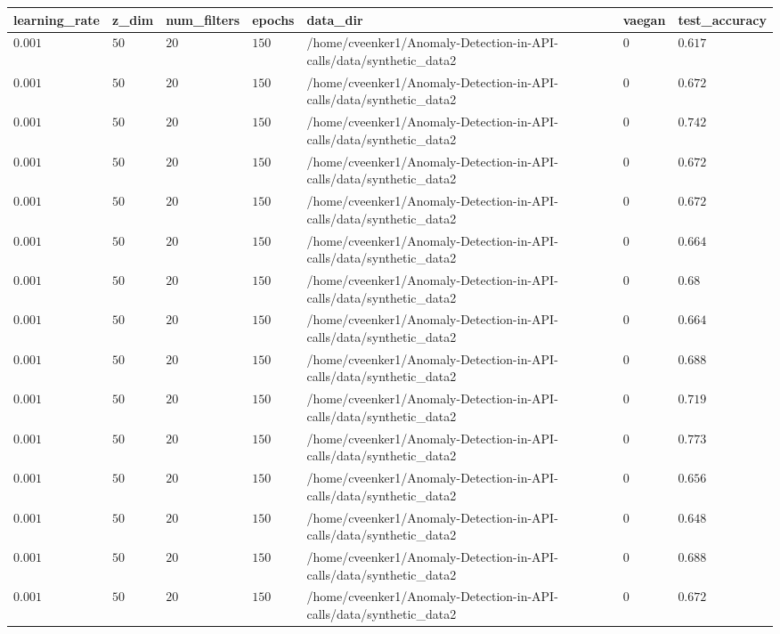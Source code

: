 \begin{table}[tbp]
\begin{tabular}{lllllll}
learning\_rate & z\_dim & num\_filters & epochs & data\_dir & vaegan & test\_accuracy \\ \hline
$0.001$ & $50$ & $20$ & $150$ & /home/cveenker1/Anomaly-Detection-in-API-calls/data/synthetic\_data2 & $0$ & $0.617$ \\
$0.001$ & $50$ & $20$ & $150$ & /home/cveenker1/Anomaly-Detection-in-API-calls/data/synthetic\_data2 & $0$ & $0.672$ \\
$0.001$ & $50$ & $20$ & $150$ & /home/cveenker1/Anomaly-Detection-in-API-calls/data/synthetic\_data2 & $0$ & $0.742$ \\
$0.001$ & $50$ & $20$ & $150$ & /home/cveenker1/Anomaly-Detection-in-API-calls/data/synthetic\_data2 & $0$ & $0.672$ \\
$0.001$ & $50$ & $20$ & $150$ & /home/cveenker1/Anomaly-Detection-in-API-calls/data/synthetic\_data2 & $0$ & $0.672$ \\
$0.001$ & $50$ & $20$ & $150$ & /home/cveenker1/Anomaly-Detection-in-API-calls/data/synthetic\_data2 & $0$ & $0.664$ \\
$0.001$ & $50$ & $20$ & $150$ & /home/cveenker1/Anomaly-Detection-in-API-calls/data/synthetic\_data2 & $0$ & $0.68$ \\
$0.001$ & $50$ & $20$ & $150$ & /home/cveenker1/Anomaly-Detection-in-API-calls/data/synthetic\_data2 & $0$ & $0.664$ \\
$0.001$ & $50$ & $20$ & $150$ & /home/cveenker1/Anomaly-Detection-in-API-calls/data/synthetic\_data2 & $0$ & $0.688$ \\
$0.001$ & $50$ & $20$ & $150$ & /home/cveenker1/Anomaly-Detection-in-API-calls/data/synthetic\_data2 & $0$ & $0.719$ \\
$0.001$ & $50$ & $20$ & $150$ & /home/cveenker1/Anomaly-Detection-in-API-calls/data/synthetic\_data2 & $0$ & $0.773$ \\
$0.001$ & $50$ & $20$ & $150$ & /home/cveenker1/Anomaly-Detection-in-API-calls/data/synthetic\_data2 & $0$ & $0.656$ \\
$0.001$ & $50$ & $20$ & $150$ & /home/cveenker1/Anomaly-Detection-in-API-calls/data/synthetic\_data2 & $0$ & $0.648$ \\
$0.001$ & $50$ & $20$ & $150$ & /home/cveenker1/Anomaly-Detection-in-API-calls/data/synthetic\_data2 & $0$ & $0.688$ \\
$0.001$ & $50$ & $20$ & $150$ & /home/cveenker1/Anomaly-Detection-in-API-calls/data/synthetic\_data2 & $0$ & $0.672$ \\

\end{tabular}
\end{table}
